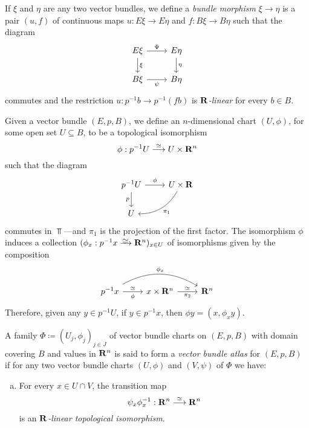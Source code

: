 \begin{definition}
\label{def:morphism-vector-bundles}
If \(\xi\) and \(\eta\) are any two vector bundles, we define a \emph{bundle
  morphism} \(\xi \to \eta\) is a pair \((u, f)\) of continuous maps \(u: E \xi
\to E \eta\) and \(f: B \xi \to B \eta\) such that the diagram
\[
\begin{tikzcd}
E \xi \ar[d, "\xi"] \ar[r, "\Psi"] &E \eta \ar[d, "\eta"] \\
B \xi \ar[r, "\psi"'] &B\eta
\end{tikzcd}
\]
commutes and the restriction \(u: p^{-1} b \to p^{-1}(f b)\) is
\emph{\(\mathbf{R}\)-linear} for every \(b \in B\).
\end{definition}

\begin{definition}
\label{def:vector-bundle-chart-and-atlas}
Given a vector bundle \((E, p, B)\), we define an \(n\)-dimensional chart
\((U, \phi)\), for some open set \(U \subseteq B\), to be a topological
isomorphism
\[
\phi: p^{-1} U \overset{\simeq}\longrightarrow U \times \mathbf{R}^n
\]
such that the diagram
\[
\begin{tikzcd}
p^{-1} U \ar[r, "\phi"]
\ar[d, "p"']
&U \times \R \ar[ld, bend left, "\pi_1"] \\
U &
\end{tikzcd}
\]
commutes in \(\Top\)---and \(\pi_1\) is the projection of the first factor. The
isomorphism \(\phi\) induces a collection
\((\phi_x: p^{-1} x \isoto \R^n)_{x \in U}\) of isomorphisms given by the
composition
\[
\begin{tikzcd}
p^{-1} x \ar[r, "\phi"', "\dis"]
\ar[rr, "\phi_x", bend left]
&x \times \R^n
\ar[r, "\dis", "\pi_2"']
&\R^n
\end{tikzcd}
\]
Therefore, given any \(y \in p^{-1} U\), if \(y \in p^{-1} x\), then
\(\phi y = (x, \phi_x y)\).

A family \(\Phi \coloneq (U_j, \phi_j)_{j \in J}\) of vector bundle charts on
\((E, p, B)\) with domain covering \(B\) and values in \(\mathbf{R}^n\) is said to form
a \emph{vector bundle atlas} for \((E, p, B)\) if for any two vector bundle
charts \((U, \phi)\) and \((V, \psi)\) of \(\Phi\) we have:
\begin{enumerate}[(a)]\setlength\itemsep{0em}
\item For every \(x \in U \cap V\), the transition map
  \[
  \psi_x \phi_x^{-1}: \mathbf{R}^n \overset{\simeq}\longrightarrow \mathbf{R}^n
  \]
  is an \emph{\(\mathbf{R}\)-linear topological isomorphism}.


\end{enumerate}
\end{definition}
